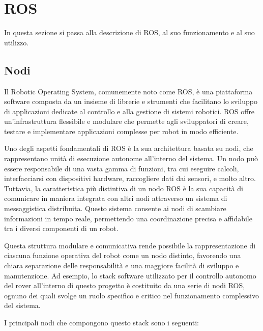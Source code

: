 \section{ROS}
In questa sezione si passa alla descrizione di ROS, al suo funzionamento e al suo utilizzo.
\subsection{Nodi}
Il Robotic Operating System, comunemente noto come ROS, è una piattaforma software composta da un insieme di librerie e strumenti che facilitano lo sviluppo di applicazioni dedicate al controllo e alla gestione di sistemi robotici. ROS offre un'infrastruttura flessibile e modulare che permette agli sviluppatori di creare, testare e implementare applicazioni complesse per robot in modo efficiente.

\noindent Uno degli aspetti fondamentali di ROS è la sua architettura basata su nodi, che rappresentano unità di esecuzione autonome all'interno del sistema. Un nodo può essere responsabile di una vasta gamma di funzioni, tra cui eseguire calcoli, interfacciarsi con dispositivi hardware, raccogliere dati dai sensori, e molto altro. Tuttavia, la caratteristica più distintiva di un nodo ROS è la sua capacità di comunicare in maniera integrata con altri nodi attraverso un sistema di messaggistica distribuita. Questo sistema consente ai nodi di scambiare informazioni in tempo reale, permettendo una coordinazione precisa e affidabile tra i diversi componenti di un robot.

\noindent Questa struttura modulare e comunicativa rende possibile la rappresentazione di ciascuna funzione operativa del robot come un nodo distinto, favorendo una chiara separazione delle responsabilità e una maggiore facilità di sviluppo e manutenzione. Ad esempio, lo stack software utilizzato per il controllo autonomo del rover all'interno di questo progetto è costituito da una serie di nodi ROS, ognuno dei quali svolge un ruolo specifico e critico nel funzionamento complessivo del sistema.

\noindent I principali nodi che compongono questo stack sono i seguenti:

